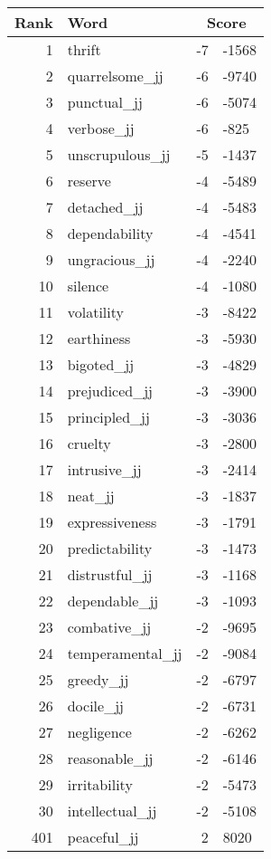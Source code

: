 \begin{longtable}[!htbp]{| rlr@{.}l |}
    \hline
    \textbf{Rank} & \textbf{Word} & \multicolumn{2}{c|}{\textbf{Score}} \\
    \hline
    \endhead
    1 & thrift & -7 & -1568 \\
    2 & quarrelsome\_jj & -6 & -9740 \\
    3 & punctual\_jj & -6 & -5074 \\
    4 & verbose\_jj & -6 & -825 \\
    5 & unscrupulous\_jj & -5 & -1437 \\
    6 & reserve & -4 & -5489 \\
    7 & detached\_jj & -4 & -5483 \\
    8 & dependability & -4 & -4541 \\
    9 & ungracious\_jj & -4 & -2240 \\
    10 & silence & -4 & -1080 \\
    11 & volatility & -3 & -8422 \\
    12 & earthiness & -3 & -5930 \\
    13 & bigoted\_jj & -3 & -4829 \\
    14 & prejudiced\_jj & -3 & -3900 \\
    15 & principled\_jj & -3 & -3036 \\
    16 & cruelty & -3 & -2800 \\
    17 & intrusive\_jj & -3 & -2414 \\
    18 & neat\_jj & -3 & -1837 \\
    19 & expressiveness & -3 & -1791 \\
    20 & predictability & -3 & -1473 \\
    21 & distrustful\_jj & -3 & -1168 \\
    22 & dependable\_jj & -3 & -1093 \\
    23 & combative\_jj & -2 & -9695 \\
    24 & temperamental\_jj & -2 & -9084 \\
    25 & greedy\_jj & -2 & -6797 \\
    26 & docile\_jj & -2 & -6731 \\
    27 & negligence & -2 & -6262 \\
    28 & reasonable\_jj & -2 & -6146 \\
    29 & irritability & -2 & -5473 \\
    30 & intellectual\_jj & -2 & -5108 \\
    401 & peaceful\_jj & 2 & 8020 \\

\end{longtable}
